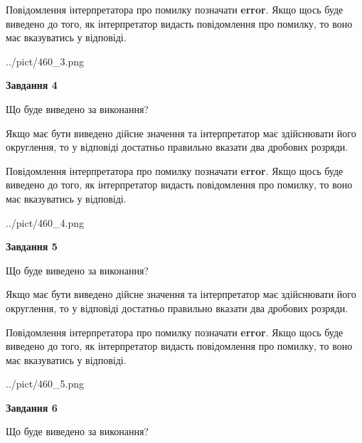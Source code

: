 \documentclass[12pt, ukrainian]{article}
\begin{document}
{\begin {Large}
Повідомлення інтерпретатора про помилку позначати \textbf{error}.
Якщо щось буде виведено до того, як інтерпретатор видасть повідомлення про помилку, 
то воно має вказуватись у відповіді. \par

\begin{center}
	{../pict/460_3.png}
\end{center}
\newpage

{\begin {center}\textbf{Завдання 4}\end {center}}\par
Що буде виведено за виконання? \par

Якщо має бути виведено дійсне значення та інтерпретатор має здійснювати його округлення, 
то у відповіді достатньо правильно вказати два дробових розряди.

Повідомлення інтерпретатора про помилку позначати \textbf{error}.
Якщо щось буде виведено до того, як інтерпретатор видасть повідомлення про помилку, 
то воно має вказуватись у відповіді. \par

\begin{center}
	{../pict/460_4.png}
\end{center}
\newpage

{\begin {center}\textbf{Завдання 5}\end {center}}\par
Що буде виведено за виконання? \par

Якщо має бути виведено дійсне значення та інтерпретатор має здійснювати його округлення, 
то у відповіді достатньо правильно вказати два дробових розряди.

Повідомлення інтерпретатора про помилку позначати \textbf{error}.
Якщо щось буде виведено до того, як інтерпретатор видасть повідомлення про помилку, 
то воно має вказуватись у відповіді. \par

\begin{center}
	{../pict/460_5.png}
\end{center}
\newpage

{\begin {center}\textbf{Завдання 6}\end {center}}\par
Що буде виведено за виконання? \par


\end{Large}}
\end{document}
